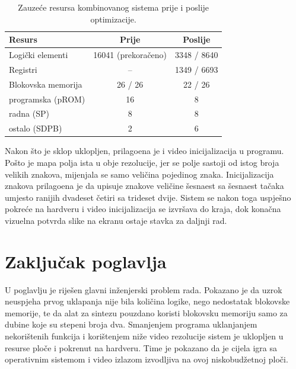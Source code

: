 \begin{table}[H]
\caption{Zauze\'ce resursa kombinovanog sistema prije i poslije optimizacije.}
\label{table:resursi}
\begin{center}
\begin{tabular}{lcc}
\hline
Resurs & Prije & Poslije \\ \hline
Logi\v{c}ki elementi & 16041 (prekora\v{c}eno) & 3348 / 8640 \\
Registri & -- & 1349 / 6693 \\
Blokovska memorija & 26 / 26 & 22 / 26 \\
\quad programska (pROM) & 16 & 8 \\
\quad radna (SP) & 8 & 8 \\
\quad ostalo (SDPB) & 2 & 6 \\ \hline
\end{tabular}
\end{center}
\end{table}

Nakon \v{s}to je sklop uklopljen, prilago\dj{}ena je i video inicijalizacija u
programu. Po\v{s}to je mapa polja ista u obje rezolucije, jer se polje sastoji od
istog broja velikih znakova, mijenjala se samo veli\v{c}ina pojedinog znaka.
Inicijalizacija znakova prilago\dj{}ena je da upisuje znakove veli\v{c}ine
\v{s}esnaest sa \v{s}esnaest ta\v{c}aka umjesto ranijih dvadeset \v{c}etiri sa
trideset dvije. Sistem se nakon toga uspje\v{s}no pokre\'ce na hardveru i video
inicijalizacija se izvr\v{s}ava do kraja, dok kona\v{c}na vizuelna potvrda slike
na ekranu ostaje stavka za daljnji rad.

\section{Zaklju\v{c}ak poglavlja}
\label{sec:uklapanje-zakljucak}

U poglavlju je rije\v{s}en glavni in\v{z}enjerski problem rada. Pokazano je da
uzrok neuspjeha prvog uklapanja nije bila koli\v{c}ina logike, nego nedostatak
blokovske memorije, te da alat za sintezu pouzdano koristi blokovsku memoriju
samo za dubine koje su stepeni broja dva. Smanjenjem programa uklanjanjem
nekori\v{s}tenih funkcija i kori\v{s}tenjem ni\v{z}e video rezolucije sistem je
uklopljen u resurse plo\v{c}e i pokrenut na hardveru. Time je pokazano da je
cijela igra sa operativnim sistemom i video izlazom izvodljiva na ovoj
niskobud\v{z}etnoj plo\v{c}i.
